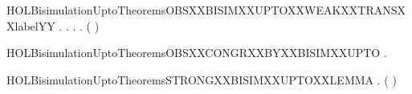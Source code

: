 \newcommand{\HOLBisimulationUptoTheoremsOBSXXBISIMXXUPTOXXWEAKXXTRANSXXlabel}{\UseVerbatim{HOLBisimulationUptoTheoremsOBSXXBISIMXXUPTOXXWEAKXXTRANSXXlabel}}
\begin{SaveVerbatim}{HOLBisimulationUptoTheoremsOBSXXBISIMXXUPTOXXWEAKXXTRANSXXlabelYY}
\HOLTokenTurnstile{} \HOLSymConst{\HOLTokenForall{}}.
         \HOLSymConst{\HOLTokenImp{}}
       \HOLSymConst{\HOLTokenForall{}} .
              \HOLSymConst{\HOLTokenImp{}}
           \HOLSymConst{\HOLTokenForall{}} .
                \HOLTokenWeakTransBegin{} \HOLTokenWeakTransEnd {} \HOLSymConst{\HOLTokenImp{}}
               \HOLSymConst{\HOLTokenExists{}}.
                    \HOLTokenWeakTransBegin{} \HOLTokenWeakTransEnd {} \HOLSymConst{\HOLTokenConj{}}
                   (    )  
\end{SaveVerbatim}
\newcommand{\HOLBisimulationUptoTheoremsOBSXXBISIMXXUPTOXXWEAKXXTRANSXXlabelYY}{\UseVerbatim{HOLBisimulationUptoTheoremsOBSXXBISIMXXUPTOXXWEAKXXTRANSXXlabelYY}}
\begin{SaveVerbatim}{HOLBisimulationUptoTheoremsOBSXXCONGRXXBYXXBISIMXXUPTO}
\HOLTokenTurnstile{} \HOLSymConst{\HOLTokenForall{}}  .   \HOLSymConst{\HOLTokenConj{}}    \HOLSymConst{\HOLTokenImp{}}   
\end{SaveVerbatim}
\newcommand{\HOLBisimulationUptoTheoremsOBSXXCONGRXXBYXXBISIMXXUPTO}{\UseVerbatim{HOLBisimulationUptoTheoremsOBSXXCONGRXXBYXXBISIMXXUPTO}}
\begin{SaveVerbatim}{HOLBisimulationUptoTheoremsSTRONGXXBISIMXXUPTOXXLEMMA}
\HOLTokenTurnstile{} \HOLSymConst{\HOLTokenForall{}}.
         \HOLSymConst{\HOLTokenImp{}}
        (    )
\end{SaveVerbatim}
